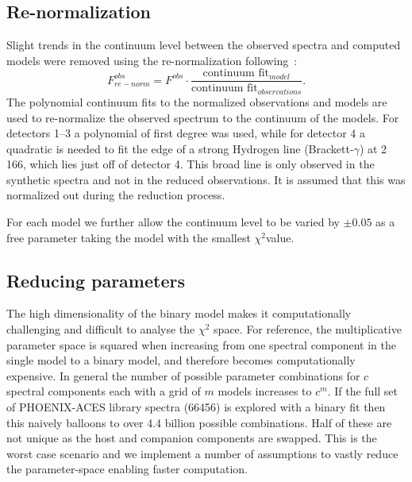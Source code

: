 \subsection{Re-normalization}
\label{subsec:renorm}
Slight trends in the continuum level between the observed spectra and computed models were removed using the re-normalization following~\citep{passegger_fundamental_2016}:
\begin{equation}
F^{obs}_{re-norm} = F^{obs} \cdot \frac{\textrm{continuum fit}_{model}}{\textrm{continuum fit}_{observations}}.
\end{equation}
The polynomial continuum fits to the normalized observations and models are used to re-normalize the observed spectrum to the continuum of the models. For detectors 1--3 a polynomial of first degree was used, while for detector 4 a quadratic is needed to fit the edge of a strong Hydrogen line (Brackett-\(\gamma\)) at 2\,166\nm{}, which lies just off of detector 4. This broad line is only observed in the synthetic spectra and not in the reduced observations. It is assumed that this was normalized out during the reduction process.

For each model we further allow the continuum level to be varied by \(\pm 0.05\) as a free parameter taking the model with the smallest \(\chi^2\)value.


\subsection{Reducing parameters}
\label{subsec:reduce-params}
The high dimensionality of the binary model makes it computationally challenging and difficult to analyse the \(\chi^2\) space.
For reference, the multiplicative parameter space is squared when increasing from one spectral component in the single model to a binary model, and therefore becomes computationally expensive. In general the number of possible parameter combinations for \(c\) spectral components each with a grid of \(m\) models increases to \(c^m\). If the full set of {PHOENIX-ACES} library spectra (66456) is explored with a binary fit then this naively balloons to over 4.4 billion possible combinations. Half of these are not unique as the host and companion components are swapped. This is the worst case scenario and we implement a number of assumptions to vastly reduce the parameter-space enabling faster computation.

